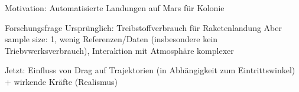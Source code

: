 
Motivation: Automatisierte Landungen auf Mars für Kolonie

Forschungsfrage
Ursprünglich: Treibstoffverbrauch für Raketenlandung
Aber sample size: 1, wenig Referenzen/Daten (insbesondere kein Triebvwerksverbrauch), Interaktion mit Atmosphäre komplexer

Jetzt:
Einfluss von Drag auf Trajektorien (in Abhängigkeit zum Eintrittswinkel)
+ wirkende Kräfte (Realismus)